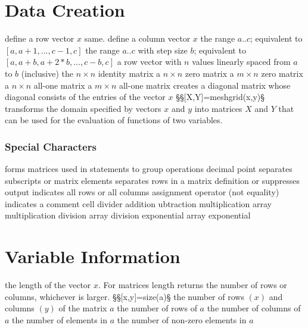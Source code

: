 

\section{Data Creation}{}
	{define a row vector $x$}
	{same.}
	{define a column vector $x$}
	{the range $a..c$; equivalent to $[a,a+1,...,c-1,c]$}
	{the range $a..c$ with step size $b$; equivalent to $[a,a+b,a+2*b,..., c-b,c]$ }
	{a row vector with $n$ values linearly spaced from $a$ to $b$ (inclusive)}
	{the $n \times n$ identity matrix}
	{a $n \times n$ zero matrix}
	{a $m \times n$ zero matrix}
	{a $n \times n$ all-one matrix}
	{a $m \times n$ all-one matrix}
	{creates a diagonal matrix whose diagonal consists of the entries of the vector $x$}
§§[X,Y]=meshgrid(x,y)§ transforms the domain specified by vectors $x$ and $y$ into matrices $X$ and $Y$ that can be used for the evaluation of functions of two variables.

\subsubsection{Special Characters}{}
\cmdOper{[]}	{forms matrices}
\cmdOper{()}	{used in statements to group operations}
	{decimal point}
\cmdOper{,! }	{separates subscripts or matrix elements}
\cmdOper{;}	{separates rows in a matrix definition or suppresses output}
\cmdOper{:}	{indicates all rows or all columns}
\cmdOper{=}	{assignment operator (not equality)}
\cmdOper{\%}	{indicates a comment}
\cmdOper{\%\%}	{cell divider}
\cmdOper{+}	{addition}
\cmdOper{-}	{ubtraction}
\cmdOper{*}	{multiplication}
	{array multiplication}
\cmdOper{/}	{division}
	{array division}
\cmdOper{\expon}	{exponential}
	{array exponential}

\section{Variable Information}{}
	{the length of the vector $x$. For matrices length returns the number of rows or columns, whichever is larger.}
§§[x,y]=size(a)§ the number of rows $(x)$ and columns $(y)$ of the matrix $a$
	{the number of rows of $a$}
	{the number of columns of $a$}
	{the number of elements in $a$}
	{the number of non-zero elements in $a$}

